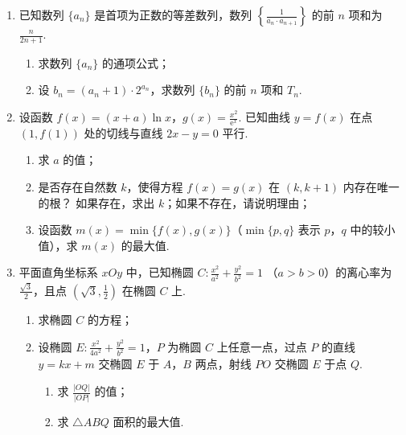 \begin{description}
\begin{enumerate}[leftmargin=5pt]
        \item 已知数列 \(\{a_n\}\) 是首项为正数的等差数列，数列 \(\left\{\frac{1}{a_n \cdot a_{n+1}}\right\}\) 的前 \(n\) 项和为 \(\frac{n}{2n+1}\).

\begin{enumerate}
\item 求数列 \(\{a_n\}\) 的通项公式；
\item 设 \(b_n = (a_n + 1)\cdot 2^{a_n}\)，求数列 \(\{b_n\}\) 的前 \(n\) 项和 \(T_n\).
\end{enumerate}

        \item 设函数 \(f(x) = (x + a)\ln x\)，\(g(x) = \frac{x^2}{{\mathrm{e}}^x}\). 已知曲线 \( y = f(x) \) 在点 \((1, f(1))\) 处的切线与直线 \( 2x - y = 0 \) 平行.

\begin{enumerate}
\item 求 \(a\) 的值；
\item 是否存在自然数 \(k\)，使得方程 \(f(x) = g(x)\) 在 \((k, k + 1)\) 内存在唯一的根？ 如果存在，求出 \(k\)；如果不存在，请说明理由；
\item 设函数 \(m(x) = \min \{f(x), g(x)\}\)（\(\min \{p, q\}\) 表示 \(p\)，\(q\) 中的较小值），求 \(m(x)\) 的最大值.
\end{enumerate}

        \item 平面直角坐标系 \(xOy\) 中，已知椭圆 \(C: \frac{x^2}{a^2} + \frac{y^2}{b^2} = 1 \) （\(a > b > 0\)）的离心率为 \(\frac{\sqrt{3}}{2}\)，且点 \(\left(\sqrt{3}, \frac{1}{2}\right)\) 在椭圆 \(C\) 上.

\begin{enumerate}
\item 求椭圆 \(C\) 的方程；
\item 设椭圆 \(E: \frac{x^2}{4a^2} + \frac{y^2}{b^2} = 1\)，\(P\) 为椭圆 \(C\) 上任意一点，过点 \(P\) 的直线 \(y = kx + m\) 交椭圆 \(E\) 于 \(A\)，\(B\) 两点，射线 \(PO\) 交椭圆 \(E\) 于点 \(Q\).
\begin{enumerate}
\item 求 \(\frac{|OQ|}{|OP|}\) 的值；
\item 求 \(\triangle ABQ\) 面积的最大值.
\end{enumerate}
\end{enumerate}

    \end{enumerate}

\end{description}


